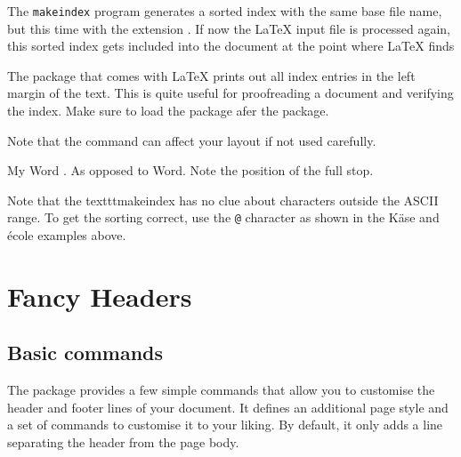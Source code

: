 The \texttt{makeindex} program generates a sorted index with the same base
file name, but this time with the extension . If now the
\LaTeX{} input file is processed again, this sorted index gets
included into the document at the point where \LaTeX{} finds
\begin{lscommand}
\end{lscommand}

The  package that comes with \LaTeX{} prints out all
index entries in the left margin of the text. This is quite useful for
proofreading a document and verifying the index. Make sure to load the package
afer the  package. 

Note that the  command can affect your layout if not used carefully.

\begin{chktexignore}
  \begin{example}
My Word . As opposed
to Word. Note the
position of the full stop.
\end{example}
\end{chktexignore}

Note that the texttt{makeindex} has no clue about characters outside the ASCII range. To
get the sorting correct, use the \verb|@| character as shown in the K\"ase
and \'ecole examples above.

\section{Fancy Headers}\label{sec:fancy}

\subsection{Basic commands}


The  package provides a few simple commands that allow you to
customise the header and footer lines of your document. It defines an
additional page style  and a set of commands to customise it to
your liking. By default, it only adds a line separating the header from the page
body.

